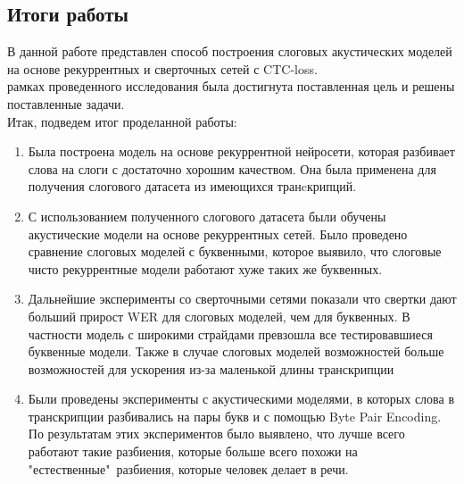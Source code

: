 \documentclass[a4paper,14pt]{extarticle}
\begin{document}
\subsection{Итоги работы}
В данной работе представлен способ построения слоговых акустических моделей 
на основе рекуррентных и сверточных сетей с  CTC-loss.\\  рамках проведенного исследования была достигнута поставленная цель и решены поставленные задачи.\fi \\
Итак, подведем итог проделанной работы:
\begin{enumerate}
	\item Была построена модель на основе рекуррентной нейросети, которая разбивает слова на слоги с достаточно хорошим качеством. Она была применена для получения слогового датасета из имеющихся транcкрипций.
	\item С использованием полученного слогового датасета были обучены акустические модели на основе рекуррентных сетей. Было проведено сравнение слоговых моделей с буквенными, которое выявило, что слоговые чисто рекуррентные модели работают хуже таких же буквенных.
	\item Дальнейшие эксперименты со сверточными сетями показали что свертки дают больший прирост WER для слоговых моделей, чем для буквенных. В частности модель с широкими страйдами превзошла все тестировавшиеся буквенные модели. Также в случае слоговых моделей возможностей больше возможностей для ускорения из-за маленькой длины транскрипции 
	\item Были проведены эксперименты с акустическими моделями, в которых слова в транскрипции разбивались на пары букв и с помощью Byte Pair Encoding. По результатам этих экспериментов было выявлено, что лучше всего работают такие разбиения, которые больше всего похожи на "естественные"\ разбиения, которые человек делает в речи.
\end{enumerate}
\end{document}
